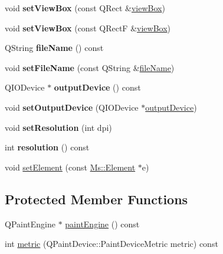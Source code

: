 \begin{DoxyCompactItemize}
\mbox{\label{class_svg_generator_a2fc19a8d483fe197552fdf284d040650}} 
void {\bfseries set\+View\+Box} (const Q\+Rect \&\hyperlink{class_svg_generator_a4a56c80b10833a8ded8715652d67afe2}{view\+Box})
\item 
\mbox{\label{class_svg_generator_a446b2b8e23edb99e3afbf68153cf6012}} 
void {\bfseries set\+View\+Box} (const Q\+RectF \&\hyperlink{class_svg_generator_a4a56c80b10833a8ded8715652d67afe2}{view\+Box})
\item 
\mbox{\label{class_svg_generator_a52e5ef0ac1861b68dfc5dc3158edb958}} 
Q\+String {\bfseries file\+Name} () const
\item 
\mbox{\label{class_svg_generator_a40b21199cbe6ce85835bcec515da2839}} 
void {\bfseries set\+File\+Name} (const Q\+String \&\hyperlink{class_svg_generator_a4f72398a28e315c9192a611e16f8b693}{file\+Name})
\item 
\mbox{\label{class_svg_generator_ab510af073830b3295cff2df9c030f8fd}} 
Q\+I\+O\+Device $\ast$ {\bfseries output\+Device} () const
\item 
\mbox{\label{class_svg_generator_a00335dcf48097531f04d86303eb327cd}} 
void {\bfseries set\+Output\+Device} (Q\+I\+O\+Device $\ast$\hyperlink{class_svg_generator_aa03e26c21b02f54f2e318633db8496de}{output\+Device})
\item 
\mbox{\label{class_svg_generator_a1078be65d0f77c14e6972e9cf0366869}} 
void {\bfseries set\+Resolution} (int dpi)
\item 
\mbox{\label{class_svg_generator_ac7cfe222c9bcd4fc06a427ab855ab5be}} 
int {\bfseries resolution} () const
\item 
void \hyperlink{class_svg_generator_ad9b70ed3efcb850d93d88e8f7b1a697e}{set\+Element} (const \hyperlink{class_ms_1_1_element}{Ms\+::\+Element} $\ast$e)
\end{DoxyCompactItemize}
\subsection*{Protected Member Functions}
\begin{DoxyCompactItemize}
\item 
Q\+Paint\+Engine $\ast$ \hyperlink{class_svg_generator_aaf46976acd7ff8b9544e613d7ecd4887}{paint\+Engine} () const
\item 
int \hyperlink{class_svg_generator_a04c1a05554a1fd618da5928049167c98}{metric} (Q\+Paint\+Device\+::\+Paint\+Device\+Metric metric) const
\end{DoxyCompactItemize}

